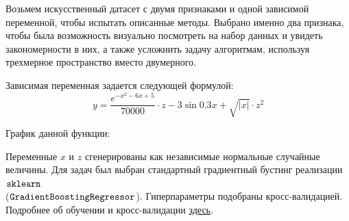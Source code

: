 Возьмем искусственный датасет с двумя признаками и одной зависимой переменной, чтобы испытать описанные методы. Выбрано именно два признака, чтобы была возможность визуально посмотреть на набор данных и увидеть закономерности в них, а также усложнить задачу алгоритмам, используя трехмерное пространство вместо двумерного.

Зависимая переменная задается следующей формулой:
\[
y = \frac{e^{-x^2-6x+5}}{70000} \cdot z - 3 \sin 0.3x + \sqrt{|x|} \cdot z^2
\]

График данной функции:

\vspace{-3mm}
\begin{figure}[h]
\end{figure}
\vspace{-3mm}

Переменные $x$ и $z$ сгенерированы как независимые нормальные случайные величины. Для задач был выбран стандартный градиентный бустинг реализации $\verb|sklearn|$\\ ($\verb|GradientBoostingRegressor|$). Гиперпараметры подобраны кросс-валидацией. Подробнее об обучении и кросс-валидации \href{https://github.com/elizacc/CW/blob/master/data%20%26%20code/Quality_check.ipynb}{здесь}.